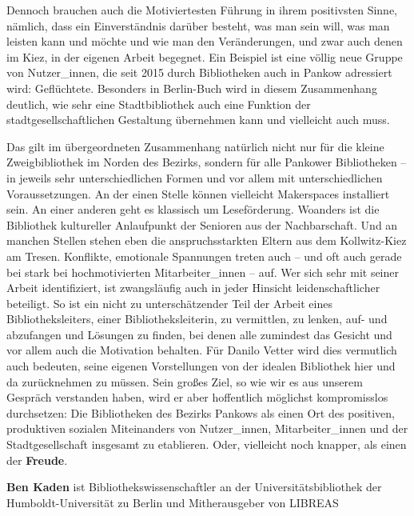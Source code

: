 \documentclass[a4paper,
fontsize=11pt,
oneside,
numbers=noperiodatend,
parskip=half-,
bibliography=totoc,
final
]{scrartcl}
\begin{document}
Dennoch brauchen auch die Motiviertesten Führung in ihrem positivsten
Sinne, nämlich, dass ein Einverständnis darüber besteht, was man sein
will, was man leisten kann und möchte und wie man den Veränderungen, und
zwar auch denen im Kiez, in der eigenen Arbeit begegnet. Ein Beispiel
ist eine völlig neue Gruppe von Nutzer\_innen, die seit 2015 durch
Bibliotheken auch in Pankow adressiert wird: Geflüchtete. Besonders in
Berlin-Buch wird in diesem Zusammenhang deutlich, wie sehr eine
Stadtbibliothek auch eine Funktion der stadtgesellschaftlichen
Gestaltung übernehmen kann und vielleicht auch muss.

Das gilt im übergeordneten Zusammenhang natürlich nicht nur für die
kleine Zweigbibliothek im Norden des Bezirks, sondern für alle Pankower
Bibliotheken -- in jeweils sehr unterschiedlichen Formen und vor allem
mit unterschiedlichen Voraussetzungen. An der einen Stelle können
vielleicht Makerspaces installiert sein. An einer anderen geht es
klassisch um Leseförderung. Woanders ist die Bibliothek kultureller
Anlaufpunkt der Senioren aus der Nachbarschaft. Und an manchen Stellen
stehen eben die anspruchsstarkten Eltern aus dem Kollwitz-Kiez am
Tresen. Konflikte, emotionale Spannungen treten auch -- und oft auch
gerade bei stark bei hochmotivierten Mitarbeiter\_innen -- auf. Wer sich
sehr mit seiner Arbeit identifiziert, ist zwangsläufig auch in jeder
Hinsicht leidenschaftlicher beteiligt. So ist ein nicht zu
unterschätzender Teil der Arbeit eines Bibliotheksleiters, einer
Bibliotheksleiterin, zu vermittlen, zu lenken, auf- und abzufangen und
Lösungen zu finden, bei denen alle zumindest das Gesicht und vor allem
auch die Motivation behalten. Für Danilo Vetter wird dies vermutlich
auch bedeuten, seine eigenen Vorstellungen von der idealen Bibliothek
hier und da zurücknehmen zu müssen. Sein großes Ziel, so wie wir es aus
unserem Gespräch verstanden haben, wird er aber hoffentlich möglichst
kompromisslos durchsetzen: Die Bibliotheken des Bezirks Pankows als
einen Ort des positiven, produktiven sozialen Miteinanders von
Nutzer\_innen, Mitarbeiter\_innen und der Stadtgesellschaft insgesamt zu
etablieren. Oder, vielleicht noch knapper, als einen der
\textbf{Freude}.

\textbf{Ben Kaden} ist Bibliothekswissenschaftler an der
Universitätsbibliothek der Humboldt-Universität zu Berlin und
Mitherausgeber von LIBREAS
\end{document}
